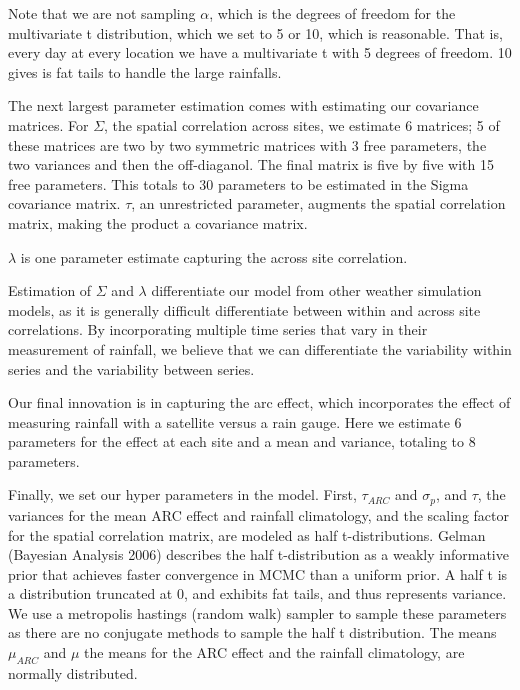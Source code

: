 \documentclass[12pt]{article}
\begin{document}
Note that we are not sampling $\alpha$, which is the degrees of freedom for the multivariate t distribution, which we set to 5 or 10, which is reasonable. That is, every day at every location we have a multivariate t with 5 degrees of freedom. 10 gives is fat tails to handle the large rainfalls. 

The next largest parameter estimation comes with estimating our covariance matrices. For $\Sigma$, the spatial correlation across sites, we estimate 6 matrices;  5 of these matrices are two by two symmetric matrices with 3 free parameters, the two variances and then the off-diaganol. The final matrix is five by five with 15 free parameters. This totals to 30 parameters to be estimated in the Sigma covariance matrix. $\tau$, an unrestricted parameter, augments the spatial correlation matrix, making the product a covariance matrix. 

$\lambda$ is one parameter estimate capturing the across site correlation. 

Estimation of $\Sigma$ and $\lambda$ differentiate our model from other weather simulation models, as it is generally difficult differentiate between within and across site correlations. By incorporating multiple time series that vary in their measurement of rainfall, we believe that we can differentiate the variability within series and the variability between series. 

Our final innovation is in capturing the arc effect, which incorporates the effect of measuring rainfall with a satellite versus a rain gauge. Here we estimate 6 parameters for the effect at each site and a mean and variance, totaling to 8 parameters. 

Finally, we set our hyper parameters in the model. First, $\tau_{ARC}$ and $\sigma_p$, and $\tau$, the variances for the mean ARC effect and rainfall climatology, and the scaling factor for the spatial correlation matrix, are modeled as half t-distributions. Gelman (Bayesian Analysis 2006) describes the half t-distribution as a weakly informative prior that achieves faster convergence in MCMC than a uniform prior. A half t is a distribution truncated at 0, and exhibits fat tails, and thus represents variance. We use a metropolis hastings (random walk) sampler to sample these parameters as there are no conjugate methods to sample the half t distribution. The means $\mu_{ARC}$ and $\mu$ the means for the ARC effect and the rainfall climatology, are normally distributed. 
\end{document}
